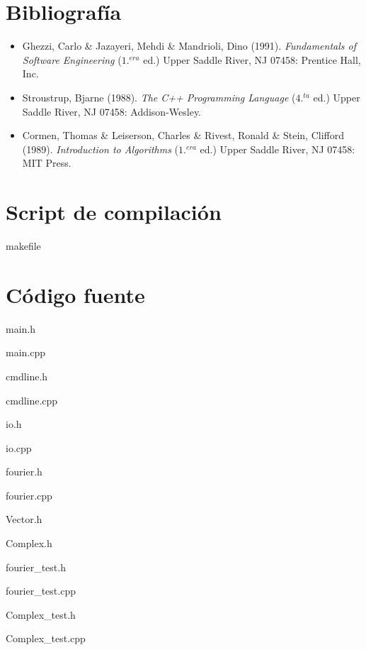 \documentclass[12pt,a4paper]{report}
\begin{document}
	\section{Bibliografía}
		
		\begin{itemize}
		\item Ghezzi, Carlo \& Jazayeri, Mehdi \& Mandrioli, Dino (1991). \textit{Fundamentals of Software Engineering} ($1.^{era}$ ed.) Upper Saddle River, NJ 07458: Prentice Hall, Inc.
		\item Stroustrup, Bjarne  (1988). \textit{The C++ Programming Language}  ($4.^{ta}$ ed.) Upper Saddle River, NJ 07458: Addison-Wesley.
		\item Cormen, Thomas \& Leiserson, Charles \& Rivest, Ronald \& Stein, Clifford (1989). \textit{Introduction to Algorithms} ($1.^{era}$ ed.) Upper Saddle River, NJ 07458: MIT Press.
		\end{itemize}

	\section{Script de compilación}
	
		makefile
		
				
	\section{Código fuente}
	
		main.h
		

   		main.cpp
		

		cmdline.h
		
		
		cmdline.cpp
				
		
		io.h
		

		io.cpp
		

		fourier.h
		
		
		fourier.cpp
		
						
		Vector.h
		
		
		Complex.h
		

		fourier\_test.h
		

		fourier\_test.cpp
		

		Complex\_test.h
		

		Complex\_test.cpp
		

		
		
	
\end{document}

